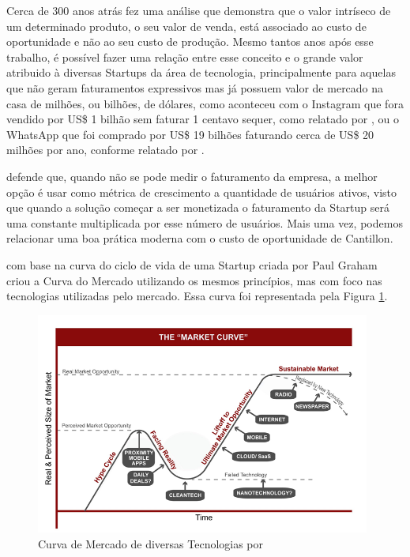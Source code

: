 Cerca de 300 anos atrás  fez uma análise que demonstra que o valor intríseco de um determinado produto, o seu valor de venda, está associado ao custo de oportunidade e não ao seu custo de produção. Mesmo tantos anos após esse trabalho, é possível fazer uma relação entre esse conceito e o grande valor atribuido à diversas Startups da área de tecnologia, principalmente para aquelas que não geram faturamentos expressivos mas já possuem valor de mercado na casa de milhões, ou bilhões, de dólares, como aconteceu com o Instagram que fora vendido por US\$ 1 bilhão sem faturar 1 centavo sequer, como relatado por , ou o WhatsApp que foi comprado por US\$ 19 bilhões faturando cerca de US\$ 20 milhões por ano, conforme relatado por . 

 defende que, quando não se pode medir o faturamento da empresa, a melhor opção é usar como métrica de crescimento a quantidade de usuários ativos, visto que quando a solução começar a ser monetizada o faturamento da Startup será uma constante multiplicada por esse número de usuários. Mais uma vez, podemos relacionar uma boa prática moderna com o custo de oportunidade de Cantillon.

 com base na curva do ciclo de vida de uma Startup criada por Paul Graham criou a Curva do Mercado utilizando os mesmos princípios, mas com foco nas tecnologias utilizadas pelo mercado. Essa curva foi representada pela Figura \ref{figure:market_curve}.

\begin{figure}[!htb]
\centering
\includegraphics[width=11cm,angle=0]{figuras/market_curve}
\caption{Curva de Mercado de diversas Tecnologias por \cite{Pepper2012}}
\label{figure:market_curve}
\end{figure}

